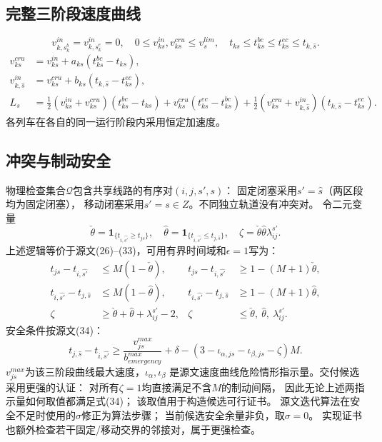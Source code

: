 \documentclass{ctexart}
\begin{document}
\subsection*{完整三阶段速度曲线}
\[
v^{in}_{k,s_k^b}=v^{in}_{k,s_k^e}=0,\quad
0\le v^{in}_{ks},v^{cru}_{ks}\le v_s^{lim},\quad
t_{ks}\le t^{bc}_{ks}\le t^{ec}_{ks}\le t_{k,\widehat s}.
\]
\begin{align*}
v^{cru}_{ks}&=v^{in}_{ks}+a_{ks}(t^{bc}_{ks}-t_{ks}),\\
v^{in}_{k,\widehat s}&=v^{cru}_{ks}+b_{ks}(t_{k,\widehat s}-t^{ec}_{ks}),\\
L_s&=\tfrac12(v^{in}_{ks}+v^{cru}_{ks})(t^{bc}_{ks}-t_{ks})
 +v^{cru}_{ks}(t^{ec}_{ks}-t^{bc}_{ks})
 +\tfrac12(v^{cru}_{ks}+v^{in}_{k,\widehat s})(t_{k,\widehat s}-t^{ec}_{ks}).
\end{align*}
各列车在各自的同一运行阶段内采用恒定加速度。

\subsection*{冲突与制动安全}
物理检查集合$\mathcal Q$包含共享线路的有序对$(i,j,s',s)$：
固定闭塞采用$s'=\widehat s$（两区段均为固定闭塞），
移动闭塞采用$s'=s\in Z$。不同独立轨道没有冲突对。
令二元变量
\[
\check\theta=\mathbf1_{\{t_{i,\widehat{s'}}\ge t_{js}\}},\quad
\hat\theta=\mathbf1_{\{t_{i,\widehat{s'}}\le t_{j,\widehat s}\}},\quad
\zeta=\check\theta\hat\theta\lambda_{ij}^{s'}.
\]
上述逻辑等价于源文(26)--(33)，可用有界时间域和$\epsilon=1$写为：
\begin{align*}
t_{js}-t_{i,\widehat{s'}}&\le M(1-\check\theta),&
t_{js}-t_{i,\widehat{s'}}&\ge1-(M+1)\check\theta,\\
t_{i,\widehat{s'}}-t_{j,\widehat s}&\le M(1-\hat\theta),&
t_{i,\widehat{s'}}-t_{j,\widehat s}&\ge1-(M+1)\hat\theta,\\
\zeta&\ge\check\theta+\hat\theta+\lambda_{ij}^{s'}-2,&
\zeta&\le\check\theta,\ \hat\theta,\ \lambda_{ij}^{s'} .
\end{align*}
安全条件按源文(34)：
\[
t_{j,\widehat s}-t_{i,\widehat{s'}}
\ge \frac{v^{max}_{js}}{b^{max}_{emergency}}+\delta
 -(3-\iota_{\alpha,js}-\iota_{\beta,js}-\zeta)M.
\]
$v^{max}_{js}$为该三阶段曲线最大速度，$\iota_\alpha,\iota_\beta$
是源文速度曲线危险情形指示量。交付候选采用更强的认证：
对所有$\zeta=1$均直接满足不含$M$的制动间隔，
因此无论上述两指示量如何取值都满足式(34)；
该取值用于构造候选可行证书。
源文迭代算法在安全不足时使用的$\sigma$修正为算法步骤；
当前候选安全余量非负，取$\sigma=0$。
实现证书也额外检查若干固定/移动交界的邻接对，属于更强检查。
\end{document}
